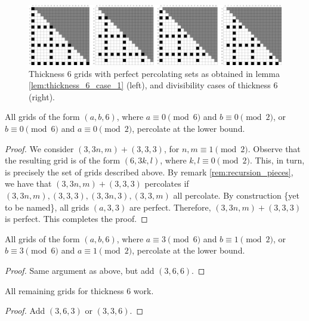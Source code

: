 \begin{figure}[]
\centering
\includegraphics[width=\textwidth]{figures/3/thickness_6_case_1.pdf}
\caption{Thickness 6 grids with perfect percolating sets as obtained in lemma \ref{lem:thickness_6_case_1} (left), and divisibility cases of thickness 6 (right).}
\label{fig:thickness_6_case_1}
\end{figure}

\begin{lem}
\label{lem:thickness_6_case_1}
All grids of the form $(a,b,6)$, where $a \equiv 0 \pmod 6$ and $b \equiv 0 \pmod 2$, or $b \equiv 0 \pmod 6$ and $a \equiv 0 \pmod 2$, percolate at the lower bound.
\end{lem}

\begin{proof}
We consider $(3,3n,m) + (3,3,3)$, for $n,m \equiv 1 \pmod 2$. Observe that the resulting grid is of the form $(6, 3k, l)$, where $k,l \equiv 0 \pmod 2$. This, in turn, is precisely the set of grids described above. By remark \ref{rem:recursion_pieces}, we have that $(3,3n,m) + (3,3,3)$ percolates if $(3,3n,m), (3,3,3), (3,3n,3),(3,3,m)$ all percolate. By construction \{yet to be named\}, all grids $(a,3,3)$ are perfect. Therefore, $(3,3n,m) + (3,3,3)$ is perfect. This completes the proof.
\end{proof}

\begin{lem}
\label{lem:thickness_6_case_2}
All grids of the form $(a,b,6)$, where $a \equiv 3 \pmod 6$ and $b \equiv 1 \pmod 2$, or $b \equiv 3 \pmod 6$ and $a \equiv 1 \pmod 2$, percolate at the lower bound.
\end{lem}

\begin{proof}
Same argument as above, but add $(3,6,6)$. 
\end{proof}

\begin{lem}
\label{lem:thickness_6_case_3}
All remaining grids for thickness 6 work.
\end{lem}

\begin{proof}
Add $(3,6,3)$ or $(3,3,6)$.
\end{proof}

